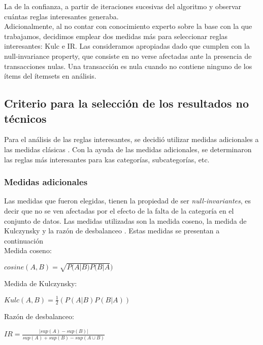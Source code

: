 \documentclass[]{article}
\begin{document}
La de la confianza, a partir de iteraciones sucesivas del algoritmo y observar cuántas reglas interesantes generaba.\\

Adicionalmente, al no contar con conocimiento experto sobre la base con la que trabajamos, decidimos emplear dos medidas más para seleccionar reglas interesantes: Kulc e IR. Las consideramos apropiadas dado que cumplen con la null-invariance property, que consiste en no verse afectadas ante la presencia de transacciones nulas. Una transacción es nula cuando no contiene ninguno de los ítems del ítemsets en análisis.

\subsection{Criterio para la selección de los resultados no técnicos}

Para el análisis de las reglas interesantes, se decidió utilizar medidas adicionales a las medidas clásicas \cite{Tan:2005:IDM:1095618}. Con la ayuda de las medidas adicionales, se determinaron las reglas más interesantes para kas categorías, subcategorías, etc. 

\subsubsection{Medidas adicionales}
Las medidas que fueron elegidas, tienen la propiedad de ser \textit{null-invariantes}, es decir que no se ven afectadas por el efecto de la falta de la categoría en el conjunto de datos. Las medidas utilizadas son la medida coseno, la medida de Kulczynsky y la razón de desbalanceo \cite{Hall:2009:WDM:1656274.1656278}. Estas medidas se presentan a continuación\\

Medida coseno:

\begin{center}
	$cosine(A,B) = \sqrt{P(A|B) P(B|A})$
	\end{center}
	
	Medida de Kulczynsky:
	
	\begin{center}
		$Kulc(A,B)= \frac{1}{2}\left(P(A|B) P(B|A)\right)$	
		\end{center}
		
		Razón de desbalanceo:
		
		\begin{center}
			$IR = \frac{|sup(A)- sup(B)|}{sup(A)+ sup(B)-sup(A \cup B)}$	
			\end{center}
\end{document}
